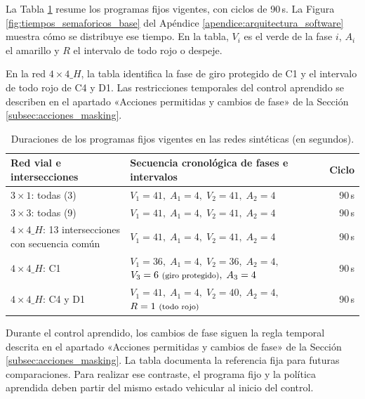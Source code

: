 La Tabla \ref{tab:tiempos_semaforicos_base} resume los programas fijos vigentes, con ciclos de 90\,s. La Figura \ref{fig:tiempos_semaforicos_base} del Apéndice \ref{apendice:arquitectura_software} muestra cómo se distribuye ese tiempo. En la tabla, $V_i$ es el verde de la fase $i$, $A_i$ el amarillo y $R$ el intervalo de todo rojo o despeje.

En la red $4\times4\_H$, la tabla identifica la fase de giro protegido de C1 y el intervalo de todo rojo de C4 y D1. Las restricciones temporales del control aprendido se describen en el apartado «Acciones permitidas y cambios de fase» de la Sección \ref{subsec:acciones_masking}.

\begin{table}[H]\centering\small
\caption{Duraciones de los programas fijos vigentes en las redes sintéticas (en segundos).}\label{tab:tiempos_semaforicos_base}
\begin{tabular}{@{}>{\raggedright\arraybackslash}p{6.2cm}>{\raggedright\arraybackslash}p{7.9cm}r@{}}\hline
\textbf{Red vial e intersecciones} & \textbf{Secuencia cronológica de fases e intervalos} & \textbf{Ciclo} \\\hline
$3\times1$: todas (3) & $V_1=41,\; A_1=4,\; V_2=41,\; A_2=4$ & 90\,s \\
$3\times3$: todas (9) & $V_1=41,\; A_1=4,\; V_2=41,\; A_2=4$ & 90\,s \\
$4\times4\_H$: 13 intersecciones con secuencia común & $V_1=41,\; A_1=4,\; V_2=41,\; A_2=4$ & 90\,s \\
$4\times4\_H$: C1 & $V_1=36,\; A_1=4,\; V_2=36,\; A_2=4,$\newline $V_3=6\text{ \footnotesize(giro protegido)},\; A_3=4$ & 90\,s \\
$4\times4\_H$: C4 y D1 & $V_1=41,\; A_1=4,\; V_2=40,\; A_2=4,$\newline $R=1\text{ \footnotesize(todo rojo)}$ & 90\,s \\\hline
\end{tabular}\end{table}

Durante el control aprendido, los cambios de fase siguen la regla temporal descrita en el apartado «Acciones permitidas y cambios de fase» de la Sección \ref{subsec:acciones_masking}. La tabla documenta la referencia fija para futuras comparaciones. Para realizar ese contraste, el programa fijo y la política aprendida deben partir del mismo estado vehicular al inicio del control.

\FloatBarrier

